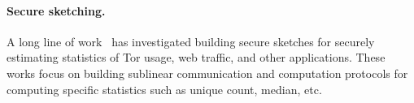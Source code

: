 



\paragraph{Secure sketching.}
A long line of work~\cite{CCS:ElaDanGol14,CCS:JanJoh16,NDSS:MelDanDec16,CCS:WJSYG19,popets:CDKY20} has investigated building secure sketches for securely estimating statistics of Tor usage, web traffic, and other applications.  These works focus on building sublinear communication and computation protocols for computing specific statistics such as unique count, median, etc.